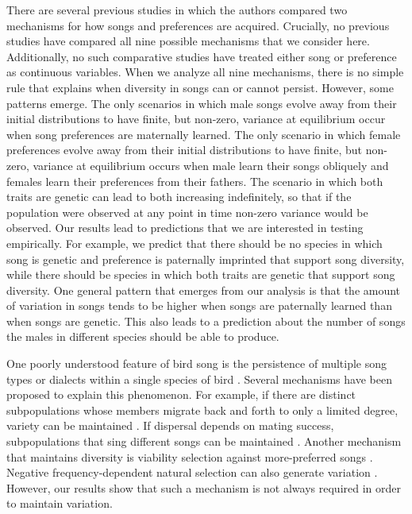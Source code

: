 \documentclass[12pt]{article}
\begin{document}
There are several previous studies in which the authors compared two mechanisms for how songs and preferences are acquired. Crucially, no previous studies have compared all nine possible mechanisms that we consider here. Additionally, no such comparative studies have treated either song or preference as continuous variables. When we analyze all nine mechanisms, there is no simple rule that explains when diversity in songs can or cannot persist. However, some patterns emerge. The only scenarios in which male songs evolve away from their initial distributions to have finite, but non-zero, variance at equilibrium occur when song preferences are maternally learned. The only scenario in which female preferences evolve away from their initial distributions to have finite, but non-zero, variance at equilibrium occurs when male learn their songs obliquely and females learn their preferences from their fathers. The scenario in which both traits are genetic can lead to both increasing indefinitely, so that if the population were observed at any point in time non-zero variance would be observed. Our results lead to predictions that we are interested in testing empirically. For example, we predict that there should be no species in which song is genetic and preference is paternally imprinted that support song diversity, while there should be species in which both traits are genetic that support song diversity. One general pattern that emerges from our analysis is that the amount of variation in songs tends to be higher when songs are paternally learned than when songs are genetic. This also leads to a prediction about the number of songs the males in different species should be able to produce.

One poorly understood feature of bird song is the persistence of multiple song types or dialects within a single species of bird \cite{Weissing:2011hc,Planque:2014qf}. Several mechanisms have been proposed to explain this phenomenon. For example, if there are distinct subpopulations whose members migrate back and forth to only a limited degree, variety can be maintained \cite{Planque:2014qf,Yeh:2015bh,Ellers:2003zr}. If dispersal depends on mating success, subpopulations that sing different songs can be maintained \cite{Payne:1997fk}. Another mechanism that maintains diversity is viability selection against more-preferred songs \cite{Planque:2014qf,Yeh:2015bh}. Negative frequency-dependent natural selection can also generate variation \cite{Verzijden:2005vn}. However, our results show that such a mechanism is not always required in order to maintain variation.
\end{document}
